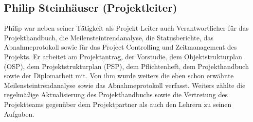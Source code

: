 \subsection{Philip Steinhäuser (Projektleiter)}
Philip war neben seiner Tätigkeit als Projekt Leiter auch Verantwortlicher für das Projekthandbuch, die Meilensteintrendanalyse, die Statusberichte, das Abnahmeprotokoll sowie für das Project Controlling und Zeitmanagement des Projekts.  Er arbeitet am Projektantrag, der Vorstudie, dem Objektstrukturplan (OSP), dem Projektstrukturplan (PSP), dem Pflichtenheft, dem Projekthandbuch sowie der Diplomarbeit mit. Von ihm wurde weiters die eben schon erwähnte Meilensteintrendanalyse sowie das Abnahmeprotokoll verfasst. Weiters zählte die regelmäßige Aktualisierung des Projekthandbuchs sowie die Vertretung des Projektteams gegenüber dem Projektpartner als auch den Lehrern zu seinen Aufgaben. 
